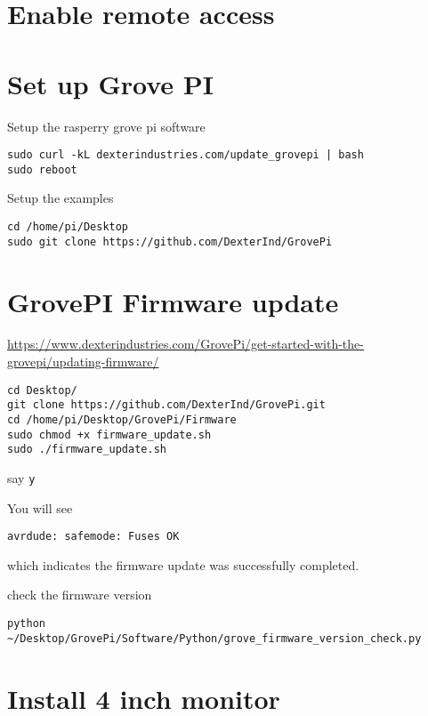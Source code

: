 \section{Enable remote access}

\section{Set up Grove PI}

Setup the rasperry grove pi software

\begin{lstlisting}
sudo curl -kL dexterindustries.com/update_grovepi | bash
sudo reboot
\end{lstlisting}

Setup the examples

\begin{lstlisting}
cd /home/pi/Desktop
sudo git clone https://github.com/DexterInd/GrovePi
\end{lstlisting}

\section{GrovePI Firmware update}

\url{https://www.dexterindustries.com/GrovePi/get-started-with-the-grovepi/updating-firmware/}

\begin{lstlisting}
cd Desktop/
git clone https://github.com/DexterInd/GrovePi.git
cd /home/pi/Desktop/GrovePi/Firmware
sudo chmod +x firmware_update.sh
sudo ./firmware_update.sh
\end{lstlisting}

say \texttt{y}

You will see

\begin{lstlisting}
avrdude: safemode: Fuses OK
\end{lstlisting}

which indicates the firmware update was successfully completed.

check the firmware version

\begin{lstlisting}
python ~/Desktop/GrovePi/Software/Python/grove_firmware_version_check.py
\end{lstlisting}

\section{Install 4 inch monitor}


